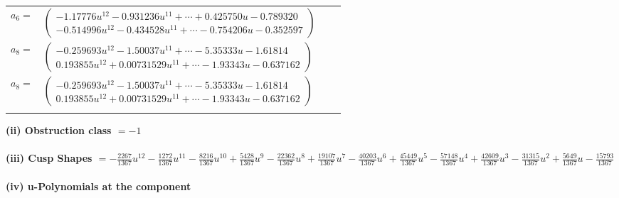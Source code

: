 \documentclass[1p]{elsarticle_modified}
\theoremstyle{definition}
\begin{document}
\begin{tabular}{m{7pt} m{180pt} m{7pt} m{180pt} }
\flushright $a_{6}=$&$\begin{pmatrix}-1.17776 u^{12}-0.931236 u^{11}+\cdots+0.425750 u-0.789320\\-0.514996 u^{12}-0.434528 u^{11}+\cdots-0.754206 u-0.352597\end{pmatrix}$ \\
\flushright $a_{8}=$&$\begin{pmatrix}-0.259693 u^{12}-1.50037 u^{11}+\cdots-5.35333 u-1.61814\\0.193855 u^{12}+0.00731529 u^{11}+\cdots-1.93343 u-0.637162\end{pmatrix}$\\ \flushright $a_{8}=$&$\begin{pmatrix}-0.259693 u^{12}-1.50037 u^{11}+\cdots-5.35333 u-1.61814\\0.193855 u^{12}+0.00731529 u^{11}+\cdots-1.93343 u-0.637162\end{pmatrix}$\\&\end{tabular}
\flushleft \textbf{(ii) Obstruction class $= -1$}\\~\\
\flushleft \textbf{(iii) Cusp Shapes $= -\frac{2267}{1367} u^{12}-\frac{1272}{1367} u^{11}-\frac{8216}{1367} u^{10}+\frac{5428}{1367} u^9-\frac{22362}{1367} u^8+\frac{19107}{1367} u^7-\frac{40203}{1367} u^6+\frac{45449}{1367} u^5-\frac{57148}{1367} u^4+\frac{42609}{1367} u^3-\frac{31315}{1367} u^2+\frac{5649}{1367} u-\frac{15793}{1367}$}\\~\\
\newpage\renewcommand{\arraystretch}{1}
\flushleft \textbf{(iv) u-Polynomials at the component}\newline \\
\end{document}
